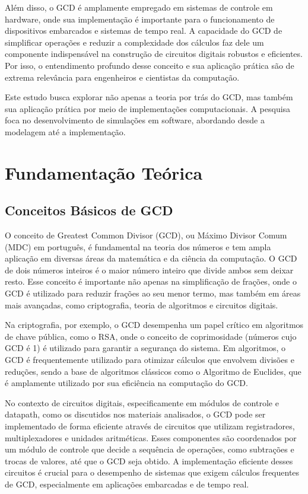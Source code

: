 \documentclass[a4paper,11pt]{article} %
\begin{document}
Além disso, o GCD é amplamente empregado em sistemas de controle em hardware, onde sua implementação é importante para o funcionamento de dispositivos embarcados e sistemas de tempo real. A capacidade do GCD de simplificar operações e reduzir a complexidade dos cálculos faz dele um componente indispensável na construção de circuitos digitais robustos e eficientes. Por isso, o entendimento profundo desse conceito e sua aplicação prática são de extrema relevância para engenheiros e cientistas da computação.

Este estudo busca explorar não apenas a teoria por trás do GCD, mas também sua aplicação prática por meio de implementações computacionais. A pesquisa foca no desenvolvimento de simulações em software, abordando desde a modelagem até a implementação.

\section{Fundamentação Teórica} 

\subsection{Conceitos Básicos de GCD}
O conceito de Greatest Common Divisor (GCD), ou Máximo Divisor Comum (MDC) em português, é fundamental na teoria dos números e tem ampla aplicação em diversas áreas da matemática e da ciência da computação. O GCD de dois números inteiros é o maior número inteiro que divide ambos sem deixar resto. Esse conceito é importante não apenas na simplificação de frações, onde o GCD é utilizado para reduzir frações ao seu menor termo, mas também em áreas mais avançadas, como criptografia, teoria de algoritmos e circuitos digitais.

Na criptografia, por exemplo, o GCD desempenha um papel crítico em algoritmos de chave pública, como o RSA, onde o conceito de coprimosidade (números cujo GCD é 1) é utilizado para garantir a segurança do sistema. Em algoritmos, o GCD é frequentemente utilizado para otimizar cálculos que envolvem divisões e reduções, sendo a base de algoritmos clássicos como o Algoritmo de Euclides, que é amplamente utilizado por sua eficiência na computação do GCD.

No contexto de circuitos digitais, especificamente em módulos de controle e datapath, como os discutidos nos materiais analisados, o GCD pode ser implementado de forma eficiente através de circuitos que utilizam registradores, multiplexadores e unidades aritméticas. Esses componentes são coordenados por um módulo de controle que decide a sequência de operações, como subtrações e trocas de valores, até que o GCD seja obtido. A implementação eficiente desses circuitos é crucial para o desempenho de sistemas que exigem cálculos frequentes de GCD, especialmente em aplicações embarcadas e de tempo real.
\end{document}
